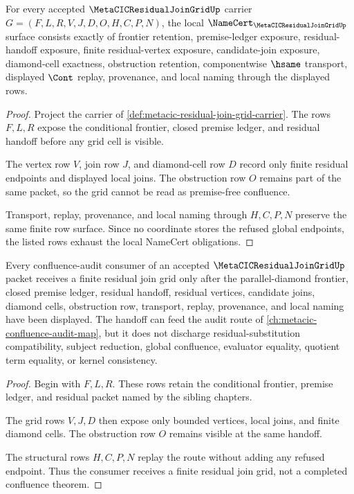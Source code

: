 \begin{theorem}
\label{thm:metacic-residual-join-grid-namecert-obligations}
For every accepted $\MetaCICResidualJoinGridUp$ carrier $G=(F,L,R,V,J,D,O,H,C,P,N)$, the local $\NameCert_{\MetaCICResidualJoinGridUp}$ surface consists exactly of frontier retention, premise-ledger exposure, residual-handoff exposure, finite residual-vertex exposure, candidate-join exposure, diamond-cell exactness, obstruction retention, componentwise $\hsame$ transport, displayed $\Cont$ replay, provenance, and local naming through the displayed rows.
\end{theorem}
\begin{proof}
Project the carrier of \autoref{def:metacic-residual-join-grid-carrier}. The rows $F,L,R$ expose the conditional frontier, closed premise ledger, and residual handoff before any grid cell is visible.

The vertex row $V$, join row $J$, and diamond-cell row $D$ record only finite residual endpoints and displayed local joins. The obstruction row $O$ remains part of the same packet, so the grid cannot be read as premise-free confluence.

Transport, replay, provenance, and local naming through $H,C,P,N$ preserve the same finite row surface. Since no coordinate stores the refused global endpoints, the listed rows exhaust the local NameCert obligations.
\end{proof}

\begin{theorem}
\label{thm:metacic-residual-join-grid-confluence-handoff}
Every confluence-audit consumer of an accepted $\MetaCICResidualJoinGridUp$ packet receives a finite residual join grid only after the parallel-diamond frontier, closed premise ledger, residual handoff, residual vertices, candidate joins, diamond cells, obstruction row, transport, replay, provenance, and local naming have been displayed. The handoff can feed the audit route of \autoref{ch:metacic-confluence-audit-map}, but it does not discharge residual-substitution compatibility, subject reduction, global confluence, evaluator equality, quotient term equality, or kernel consistency.
\end{theorem}
\begin{proof}
Begin with $F,L,R$. These rows retain the conditional frontier, premise ledger, and residual packet named by the sibling chapters.

The grid rows $V,J,D$ then expose only bounded vertices, local joins, and finite diamond cells. The obstruction row $O$ remains visible at the same handoff.

The structural rows $H,C,P,N$ replay the route without adding any refused endpoint. Thus the consumer receives a finite residual join grid, not a completed confluence theorem.
\end{proof}

